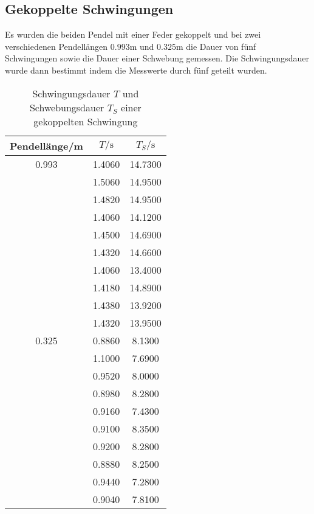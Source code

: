   \subsection{Gekoppelte Schwingungen}
    Es wurden die beiden Pendel mit einer Feder gekoppelt und bei zwei verschiedenen Pendellängen $0.993$m und $0.325$m die Dauer
    von fünf Schwingungen sowie die Dauer einer Schwebung gemessen. Die Schwingungsdauer wurde dann bestimmt indem die Messwerte
    durch fünf geteilt wurden.
    \begin{table}[H]
      \centering
        \caption{Schwingungsdauer $T$ und Schwebungsdauer $T_{S}$ einer gekoppelten Schwingung}
        \label{tab:aufgabe4}
        \begin{tabular}{S S S}
          \toprule
          {Pendellänge/m} & {$T/\si{\second}$} & {$T_{S}/\si{\second}$} \\
             &   1.4060 &     14.7300 \\
                  &   1.5060 &     14.9500 \\
                  &   1.4820 &     14.9500 \\
                  &   1.4060 &     14.1200 \\
                  &   1.4500 &     14.6900 \\
                  &   1.4320 &     14.6600 \\
                  &   1.4060 &     13.4000 \\
                  &   1.4180 &     14.8900 \\
                  &   1.4380 &     13.9200 \\
                  &   1.4320 &     13.9500 \\
          0.325   &   0.8860 &     8.1300 \\
                  &   1.1000 &     7.6900 \\
                  &   0.9520 &     8.0000 \\
                  &   0.8980 &     8.2800 \\
                  &   0.9160 &     7.4300 \\
                  &   0.9100 &     8.3500 \\
                  &   0.9200 &     8.2800 \\
                  &   0.8880 &     8.2500 \\
                  &   0.9440 &     7.2800 \\
                  &   0.9040 &     7.8100 \\
          \bottomrule
        \end{tabular}
      \end{table}
      \\
